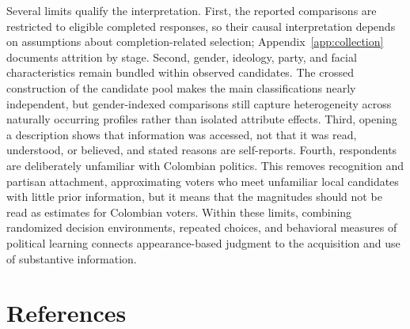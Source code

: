 \documentclass[11pt]{article}\usepackage[]{graphicx}\usepackage[]{xcolor}
\begin{document}
Several limits qualify the interpretation. First, the reported comparisons are restricted to eligible completed responses, so their causal interpretation depends on assumptions about completion-related selection; Appendix~\ref{app:collection} documents attrition by stage. Second, gender, ideology, party, and facial characteristics remain bundled within observed candidates. The crossed construction of the candidate pool makes the main classifications nearly independent, but gender-indexed comparisons still capture heterogeneity across naturally occurring profiles rather than isolated attribute effects. Third, opening a description shows that information was accessed, not that it was read, understood, or believed, and stated reasons are self-reports. Fourth, respondents are deliberately unfamiliar with Colombian politics. This removes recognition and partisan attachment, approximating voters who meet unfamiliar local candidates with little prior information, but it means that the magnitudes should not be read as estimates for Colombian voters. Within these limits, combining randomized decision environments, repeated choices, and behavioral measures of political learning connects appearance-based judgment to the acquisition and use of substantive information.

\enlargethispage{\baselineskip}
\section*{References}
\end{document}
